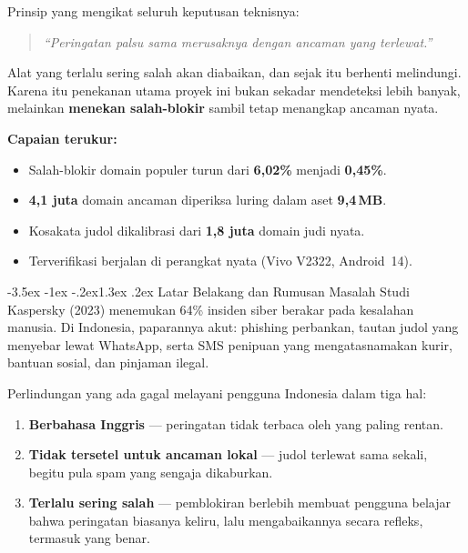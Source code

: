 \documentclass[11pt,a4paper]{article}
\makeatletter
\renewcommand\section{\@startsection{section}{1}{\z@}%
  {-3.5ex \@plus -1ex \@minus -.2ex}{1.3ex \@plus.2ex}%
  {\normalfont\Large\bfseries\color{navy}}}
\makeatother
\begin{document}
Prinsip yang mengikat seluruh keputusan teknisnya:
\begin{quote}
  \itshape ``Peringatan palsu sama merusaknya dengan ancaman yang
  terlewat.''
\end{quote}
Alat yang terlalu sering salah akan diabaikan, dan sejak itu berhenti
melindungi. Karena itu penekanan utama proyek ini bukan sekadar mendeteksi
lebih banyak, melainkan \textbf{menekan salah-blokir} sambil tetap
menangkap ancaman nyata.

\vspace{0.5em}
\noindent\textbf{Capaian terukur:}
\begin{itemize}[leftmargin=1.4em,itemsep=2pt]
  \item Salah-blokir domain populer turun dari \textbf{6{,}02\%} menjadi
        \textbf{0{,}45\%}.
  \item \textbf{4{,}1 juta} domain ancaman diperiksa luring dalam aset
        \textbf{9{,}4\,MB}.
  \item Kosakata judol dikalibrasi dari \textbf{1{,}8 juta} domain judi
        nyata.
  \item Terverifikasi berjalan di perangkat nyata (Vivo V2322, Android~14).
\end{itemize}

\section{Latar Belakang dan Rumusan Masalah}
Studi Kaspersky (2023) menemukan 64\% insiden siber berakar pada kesalahan
manusia. Di Indonesia, paparannya akut: phishing perbankan, tautan judol
yang menyebar lewat WhatsApp, serta SMS penipuan yang mengatasnamakan
kurir, bantuan sosial, dan pinjaman ilegal.

Perlindungan yang ada gagal melayani pengguna Indonesia dalam tiga hal:
\begin{enumerate}[leftmargin=1.6em,itemsep=3pt]
  \item \textbf{Berbahasa Inggris} — peringatan tidak terbaca oleh yang
        paling rentan.
  \item \textbf{Tidak tersetel untuk ancaman lokal} — judol terlewat sama
        sekali, begitu pula spam yang sengaja dikaburkan.
  \item \textbf{Terlalu sering salah} — pemblokiran berlebih membuat
        pengguna belajar bahwa peringatan biasanya keliru, lalu
        mengabaikannya secara refleks, termasuk yang benar.
\end{enumerate}
\end{document}
